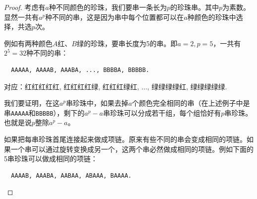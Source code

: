 \documentclass[b5paper]{ctexart}
\begin{document}
\begin{proof}
考虑有$a$种不同颜色的珍珠，我们要串一条长为$p$的珍珠串。其中$p$为素数。显然一共有$a^p$种不同的串，这是因为串中每个位置都可以在$a$种颜色的珍珠中选择，共选$p$次。

例如有两种颜色$A$红、$B$绿的珍珠，要串长度为5的串。即$a = 2, p = 5$，一共有$2^5 = 32$种不同的串：

\begin{verbatim}
  AAAAA, AAAAB, AAABA, ..., BBBBA, BBBBB.
\end{verbatim}

对应：红红红红红, 红红红红绿, 红红红绿红, ..., 绿绿绿绿红, 绿绿绿绿绿.

我们要证明，在这$a^p$串珍珠中，如果去掉$a$个颜色完全相同的串（在上述例子中是串\texttt{AAAAA}和\texttt{BBBBB}），剩下的$a^p - a$串珍珠可以分成若干组，每个组恰好有$p$串珍珠。也就是说$p$整除$a^p - a$。

如果把每串珍珠首尾连接起来做成项链。原来有些不同的串会变成相同的项链。如果一个串可以通过旋转变换成另一个，这两个串必然做成相同的项链。例如下面的5串珍珠可以做成相同的项链：

\begin{verbatim}
  AAAAB, AAABA, AABAA, ABAAA, BAAAA.
\end{verbatim}


\end{proof}
\end{document}
